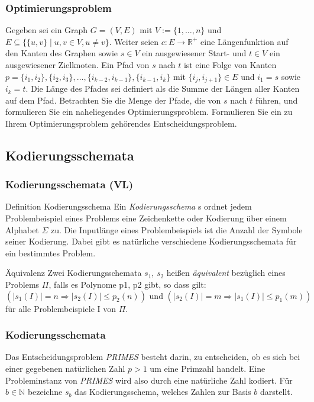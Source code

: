 \documentclass{beamer}
\begin{document}
{\begin{frame}
 \frametitle{Optimierungsproblem}
 Gegeben sei ein Graph $G=(V,E)$ mit $V:=\{1,\ldots,n\}$ und $E\subseteq \{\{u,v\} \mid u,v \in V, u\neq v\}$. Weiter seien $c:E \rightarrow \mathbb{R}^+$ eine Längenfunktion auf den Kanten des Graphen sowie $s\in V$ ein ausgewiesener Start- und $t\in V$ ein ausgewiesener Zielknoten. 
Ein Pfad von $s$ nach $t$ ist eine Folge von Kanten $p = \{i_1,i_2\},\{i_2,i_3\},\ldots,\{i_{k-2},i_{k-1}\},\{i_{k-1},i_k\}$ mit $\{i_j, i_{j+1}\} \in E$ und $i_1=s$ sowie $i_k=t$. 
Die Länge des Pfades sei definiert als die Summe der Längen aller Kanten auf dem Pfad. 
Betrachten Sie die Menge der Pfade, die von $s$ nach $t$ führen, und formulieren Sie ein naheliegendes Optimierungsproblem. 
Formulieren Sie ein zu Ihrem Optimierungsproblem gehörendes Entscheidungsproblem.
\end{frame}

\subsection{Kodierungsschemata}
\begin{frame}
 \frametitle{Kodierungsschemata (VL)}
 \begin{block}{Definition Kodierungsschema}
 Ein \emph{Kodierungsschema} s ordnet jedem Problembeispiel eines Problems eine Zeichenkette oder Kodierung über einem Alphabet $\Sigma$ zu. 
 Die Inputlänge eines Problembeispiels ist die Anzahl der Symbole seiner Kodierung.
 Dabei gibt es natürliche verschiedene Kodierungsschemata für ein bestimmtes Problem.
 \end{block}
 \begin{block}{Äquivalenz}
  Zwei Kodierungsschemata $s_1$, $s_2$ heißen \emph{äquivalent} bezüglich eines Problems $\Pi$, falls es Polynome p1, p2 gibt, so dass gilt:
  \[
   (|s_1(I)| = n \Rightarrow |s_2(I)| \leq p_2(n))\mbox{ und } (|s_2(I)| = m \Rightarrow |s_1(I)| \leq p_1(m))
  \]
für alle Problembeispiele I von $\Pi$.
 \end{block}
\end{frame}

\begin{frame}
 \frametitle{Kodierungsschemata}
 Das Entscheidungsproblem \textit{PRIMES} besteht darin, zu entscheiden, ob es sich bei einer gegebenen natürlichen Zahl $p>1$ um eine Primzahl handelt. 
Eine Probleminstanz von \textit{PRIMES} wird also durch eine natürliche Zahl kodiert. 
Für $b\in \mathbb{N}$ bezeichne $s_b$ das Kodierungsschema, welches Zahlen zur Basis $b$ darstellt.


\end{frame}}
\end{document}
